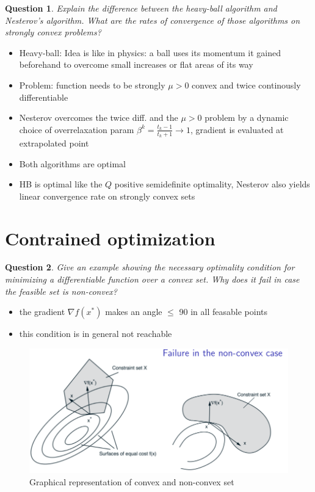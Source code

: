 \documentclass{article}
\newtheorem{question}{Question}
\begin{document}
\begin{question}
  Explain the difference between the heavy-ball algorithm and Nesterov’s algorithm. What are the
  rates of convergence of those algorithms on strongly convex problems?
\end{question}
\begin{itemize}
\item Heavy-ball: Idea is like in physics: a ball uses its momentum it gained beforehand to overcome
  small increases or flat areas of its way
\item Problem: function needs to be strongly $\mu > 0$ convex and twice continously differentiable
\item Nesterov overcomes the twice diff. and the $\mu > 0$ problem by a dynamic choice of
  overrelaxation param $\beta^k = \frac{t_k - 1}{t_k + 1} \rightarrow 1$, gradient is evaluated at
  extrapolated point
\item Both algorithms are optimal
\item HB is optimal like the $Q$ positive semidefinite optimality, Nesterov also yields linear
  convergence rate on strongly convex sets
\end{itemize}

\section{Contrained optimization}

\begin{question}
  Give an example showing the necessary optimality condition for minimizing a differentiable
  function over a convex set. Why does it fail in case the feasible set is non-convex?
\end{question}
\begin{itemize}
\item the gradient $\nabla f(x^*)$ makes an angle $\leq$ 90 in all feasable points
\item this condition is in general not reachable

\end{itemize}
\begin{figure}[H]
  \includegraphics[width=\textwidth]{non_convex.png}
  \caption{Graphical representation of convex and non-convex set \label{fig:convex}}
\end{figure}
\end{document}
